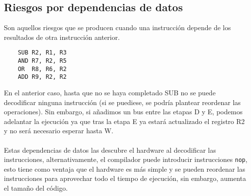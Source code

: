 \subsection{Riesgos por dependencias de datos}
Son aquellos riesgos que se producen cuando una instrucción depende de los resultados de otra instrucción anterior. 
\begin{center}
    \begin{minipage}{0.3\textwidth}
        \begin{verbatim}
    SUB R2, R1, R3
    AND R7, R2, R5
    OR  R8, R6, R2
    ADD R9, R2, R2
        \end{verbatim}
    \end{minipage}
    \begin{minipage}{0.28\textwidth}
        

    \end{minipage}
    \begin{minipage}{0.4\textwidth}
        
    \end{minipage}
\end{center}
En el anterior caso, hasta que no se haya completado SUB no se puede decodificar ninguna instrucción (si se puediese, se podría plantear reordenar las operaciones). Sin embargo, 
si añadimos un bus entre las etapas D y E, podemos adelantar la ejecución ya que tras la etapa E ya estará actualizado el registro R2 y no será necesario esperar hasta W.
\\ \\ 
Estas dependencias de datos las descubre el hardware al decodificar
las instrucciones, alternativamente, el compilador puede introducir instrucciones \texttt{nop}, 
esto tiene como ventaja que el hardware es más simple y se pueden reordenar las instrucciones 
para aprovechar todo el tiempo de ejecución, sin embargo, aumenta el tamaño del código.
